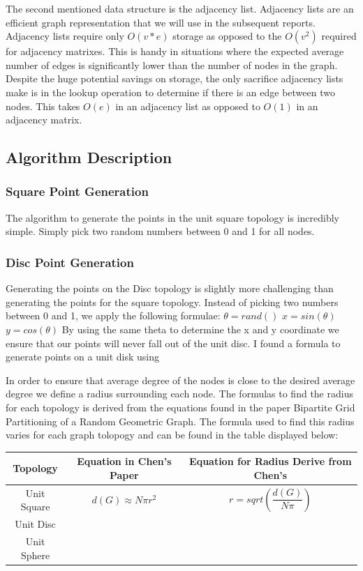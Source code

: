 \documentclass{article}
\begin{document}
    The second mentioned data structure is the adjacency list.
    Adjacency lists are an efficient graph representation that we will use in the subsequent reports.
    Adjacency lists require only $O(v*e)$ storage as opposed to the $O(v^2)$ required for adjacency matrixes.
    This is handy in situations where the expected average number of edges is significantly lower than the number of nodes in the graph.
    Despite the huge potential savings on storage, the only sacrifice adjacency lists make is in the lookup operation to determine if there is an edge between two nodes.
    This takes $O(e)$ in an adjacency list as opposed to $O(1)$ in an adjacency matrix.
	  \subsection{Algorithm Description}
    \subsubsection{Square Point Generation}
    The algorithm to generate the points in the unit square topology is incredibly simple.
    Simply pick two random numbers between 0 and 1 for all nodes.
    \subsubsection{Disc Point Generation}
    Generating the points on the Disc topology is slightly more challenging than generating the points for the square topology.
    Instead of picking two numbers between 0 and 1, we apply the following formulae:
      $\theta=rand()$
      $x=sin(\theta)$
      $y=cos(\theta)$
    By using the same theta to determine the x and y coordinate we ensure that our points will never fall out of the unit disc.
    I found a formula to generate points on a unit disk using \cite{40023}

    In order to ensure that average degree of the nodes is close to the desired average degree we define a radius surrounding each node.
    The formulas to find the radius for each topology is derived from the equations found in the paper Bipartite Grid Partitioning of a Random Geometric Graph\cite{chen2017bipartite}.
    The formula used to find this radius varies for each graph tolopogy and can be found in the table displayed below:

    \begin{tabular}{ |c|c|c| }
  	  \hline
  	  Topology & Equation in Chen's Paper & Equation for Radius Derive from Chen's \\
  	  \hline
  	  Unit Square & $d(G) \approx N\pi r^2 $ & $r = sqrt(\dfrac{d(G)}{N\pi})$ \\
  	  \hline
  	  Unit Disc & & \\
  	  \hline
  	  Unit Sphere & & \\
  	  \hline
    \end{tabular}
\end{document}
